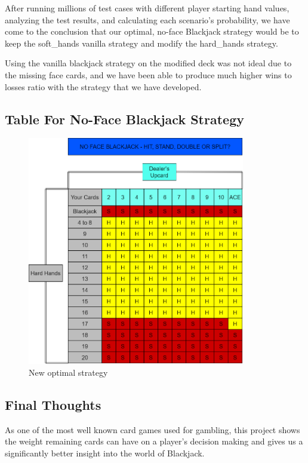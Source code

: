 \documentclass{article}
\begin{document}
{        After running millions of test cases with different player starting hand values, analyzing the test results, and calculating each scenario's probability, we have come to the conclusion that our optimal, no-face Blackjack strategy would be to keep the soft\_hands vanilla strategy and modify the hard\_hands strategy. 

        Using the vanilla blackjack strategy on the modified deck was not ideal due to the missing face cards, and we have been able to produce much higher wins to losses ratio with the strategy that we have developed. 

        \subsection{Table For No-Face Blackjack Strategy}
	\label{Table For No-Face Blackjack Strategy}
         
		\begin{figure}[H]
			\hypertarget{fig7}{}
			\begin{center}
				\includegraphics[width=9.5cm]{modified-table-strat.png}
				\caption{New optimal strategy}
			\end{center}
		\end{figure}

        \subsection{Final Thoughts}
	\label{Final Thoughts}

        As one of the most well known card games used for gambling, this project shows the weight remaining cards can have on a player's decision making and gives us a significantly better insight into the world of Blackjack. 
        
}
\end{document}
